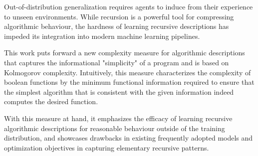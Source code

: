 %
%

Out-of-distribution generalization requires agents to induce from their experience to unseen environments. While recursion is a powerful tool for compressing algorithmic behaviour, the hardness of learning recursive descriptions has impeded its integration into modern machine learning pipelines.

This work puts forward a new complexity measure for algorithmic descriptions that captures the informational "simplicity" of a program and is based on Kolmogorov complexity.
Intuitively, this measure characterizes the complexity of boolean functions by the minimum functional information required to ensure that the simplest algorithm that is consistent with the given information indeed computes the desired function.

With this measure at hand, it emphasizes the efficacy of learning recursive algorithmic descriptions for reasonable behaviour outside of the training distribution, and showcases drawbacks in existing frequently adopted models and optimization objectives in capturing elementary recursive patterns.
